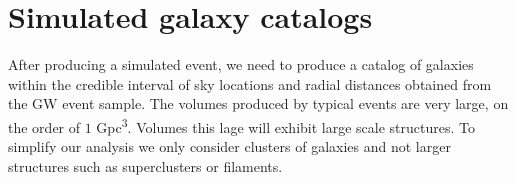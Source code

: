 





\section{\label{sec:clust_gen} Simulated galaxy catalogs}
After producing a simulated event, we need to produce a catalog of galaxies within the credible interval of sky locations and radial distances obtained from the GW event sample. The volumes produced by typical events are very large, on the order of $1$ \si{Gpc^3}. Volumes this lage will exhibit large scale structures. To simplify our analysis we only consider clusters of galaxies and not larger structures such as superclusters or filaments.

